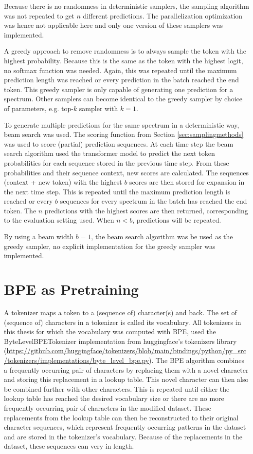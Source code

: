 Because there is no randomness in deterministic samplers, the sampling algorithm was not repeated to get $n$ different predictions.
The parallelization optimization was hence not applicable here and only one version of these samplers was implemented.

A greedy approach to remove randomness is to always sample the token with the highest probability.
Because this is the same as the token with the highest logit, no softmax function was needed.
Again, this was repeated until the maximum prediction length was reached or every prediction in the batch reached the end token.
This greedy sampler is only capable of generating one prediction for a spectrum.
Other samplers can become identical to the greedy sampler by choice of parameters, e.g. top-$k$ sampler with $k=1$.

To generate multiple predictions for the same spectrum in a deterministic way, beam search was used.
The scoring function from Section \ref{sec:samplingmethods} was used to score (partial) prediction sequences.
At each time step the beam search algorithm used the transformer model to predict the next token probabilities for each sequence stored in the previous time step.
From these probabilities and their sequence context, new scores are calculated.
The sequences (context + new token) with the highest $b$ scores are then stored for expansion in the next time step.
This is repeated until the maximum prediction length is reached or every $b$ sequences for every spectrum in the batch has reached the end token.
The $n$ predictions with the highest scores are then returned, corresponding to the evaluation setting used.
When $n < b$, predictions will be repeated.

By using a beam width $b=1$, the beam search algorithm was be used as the greedy sampler, no explicit implementation for the greedy sampler was implemented.

\section{BPE as Pretraining}
\label{sec:bpe}

A tokenizer maps a token to a (sequence of) character(s) and back. The set of (sequence of) characters in a tokenizer is called its vocabulary.
All tokenizers in this thesis for which the vocabulary was computed with \acf{BPE}, used the ByteLevelBPETokenizer implementation from huggingface's tokenizers library (\url{https://github.com/huggingface/tokenizers/blob/main/bindings/python/py_src/tokenizers/implementations/byte_level_bpe.py}).
The \ac{BPE} algorithm combines a frequently occurring pair of characters by replacing them with a novel character and storing this replacement in a lookup table.
This novel character can then also be combined further with other characters. 
This is repeated until either the lookup table has reached the desired vocabulary size or there are no more frequently occurring pair of characters in the modified dataset.
These replacements from the lookup table can then be reconstructed to their original character sequences, which represent frequently occurring patterns in the dataset and are stored in the tokenizer's vocabulary.
Because of the replacements in the dataset, these sequences can very in length.

